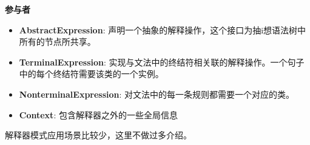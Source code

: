 \noindent\textbf{参与者}

\begin{itemize}
    \item \textbf{AbstractExpression}: 声明一个抽象的解释操作，这个接口为抽i想语法树中所有的节点所共享。
    \item \textbf{TerminalExpression}: 实现与文法中的终结符相关联的解释操作。一个句子中的每个终结符需要该类的一个实例。
    \item \textbf{NonterminalExpression}: 对文法中的每一条规则都需要一个对应的类。
    \item \textbf{Context}: 包含解释器之外的一些全局信息
\end{itemize}

解释器模式应用场景比较少，这里不做过多介绍。

\newpage